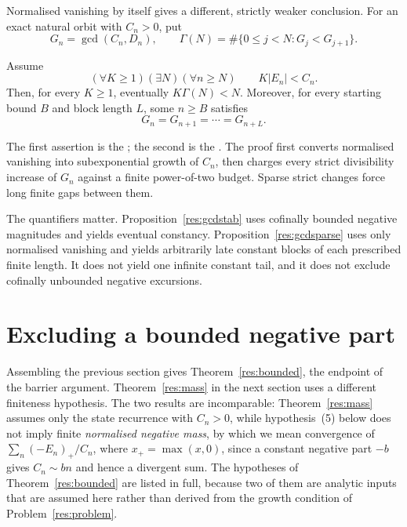 \documentclass[11pt]{article}
\begin{document}
Normalised vanishing by itself gives a different, strictly weaker conclusion.
For an exact natural orbit with $C_n>0$, put
\[
 G_n=\gcd(C_n,D_n),\qquad
 \Gamma(N)=\#\{0\le j<N:G_j<G_{j+1}\}.
\]

\begin{proposition}
\label{res:gcdsparse}
Assume
\[
  (\forall K\ge1)(\exists N)(\forall n\ge N)\qquad
  K|E_n|<C_n.
\]
Then, for every $K\ge1$, eventually $K\Gamma(N)<N$.  Moreover, for every
starting bound $B$ and block length $L$, some $n\ge B$ satisfies
\[
  G_n=G_{n+1}=\cdots=G_{n+L}.
\]
\end{proposition}

\noindent The first assertion is the
; the second is the
.  The proof first converts normalised vanishing
into subexponential growth of $C_n$, then charges every strict divisibility
increase of $G_n$ against a finite power-of-two budget.  Sparse strict changes
force long finite gaps between them.

The quantifiers matter.  Proposition~\ref{res:gcdstab} uses cofinally bounded
negative magnitudes and yields eventual constancy.  Proposition~\ref{res:gcdsparse}
uses only normalised vanishing and yields arbitrarily late constant blocks of
each prescribed finite length.  It does not yield one infinite constant tail,
and it does not exclude cofinally unbounded negative excursions.

\section{Excluding a bounded negative part}\label{sec:bounded}

Assembling the previous section gives Theorem~\ref{res:bounded}, the endpoint
of the barrier argument.  Theorem~\ref{res:mass} in the next section uses a
different finiteness hypothesis.  The two results are incomparable:
Theorem~\ref{res:mass} assumes only the state recurrence with $C_n>0$, while
hypothesis~(5) below does not imply
finite \emph{normalised negative mass}, by which we mean convergence of
$\sum_n(-E_n)_+/C_n$, where $x_+=\max(x,0)$, since a constant negative part
$-b$ gives $C_n\sim bn$ and hence a divergent sum.  The hypotheses of
Theorem~\ref{res:bounded} are listed
in full, because two of them are analytic inputs
that are assumed here rather than derived from the growth condition of
Problem~\ref{res:problem}.
\end{document}
